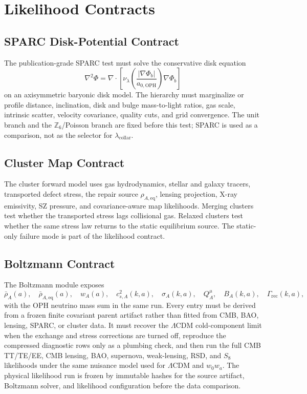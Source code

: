 \documentclass[11pt]{article}
\newcommand{\LCDM}{\Lambda\mathrm{CDM}}
\newcommand{\aoph}{a_{0,\mathrm{OPH}}}
\newcommand{\lambdac}{\lambda_{\mathrm{collar}}}
\newcommand{\Zsix}{\mathbb Z_6}
\begin{document}
\section{Likelihood Contracts}

\subsection{SPARC Disk-Potential Contract}

The publication-grade SPARC test must solve the conservative disk equation
\begin{equation}
  \nabla^2\Phi
  =
  \nabla\cdot
  \left[
    \nu_\lambda\!\left(\frac{|\nabla\Phi_b|}{\aoph}\right)
    \nabla\Phi_b
  \right]
\end{equation}
on an axisymmetric baryonic disk model.  The hierarchy must marginalize or
profile distance, inclination, disk and bulge mass-to-light ratios, gas scale,
intrinsic scatter, velocity covariance, quality cuts, and grid convergence.
The unit branch and the \(\Zsix\)/Poisson branch are fixed before this test;
SPARC is used as a comparison, not as the selector for \(\lambdac\).

\subsection{Cluster Map Contract}

The cluster forward model uses gas hydrodynamics, stellar and galaxy tracers,
transported defect stress, the repair source
\(\rho_{A,\mathrm{eq}}\), lensing projection, X-ray emissivity, SZ pressure,
and covariance-aware map likelihoods.  Merging clusters test whether the
transported stress lags collisional gas.  Relaxed clusters test whether the
same stress law returns to the static equilibrium source.  The static-only
failure mode is part of the likelihood contract.

\subsection{Boltzmann Contract}

The Boltzmann module exposes
\[
  \bar\rho_A(a),\quad
  \bar\rho_{A,\mathrm{eq}}(a),\quad
  w_A(a),\quad
  c_{s,A}^2(k,a),\quad
  \sigma_A(k,a),\quad
  Q_A^\mu,\quad
  B_A(k,a),\quad
  \Gamma_{\mathrm{rec}}(k,a),
\]
with the OPH neutrino mass sum in the same run.  Every entry must be derived
from a frozen finite covariant parent artifact rather than fitted from CMB,
BAO, lensing, SPARC, or cluster data.  It must recover the \(\LCDM\)
cold-component limit when the exchange and stress corrections are turned off,
reproduce the compressed diagnostic rows only as a plumbing check, and then run
the full CMB TT/TE/EE, CMB lensing, BAO, supernova, weak-lensing, RSD, and
\(S_8\) likelihoods under the same nuisance model used for \(\LCDM\) and
\(w_0w_a\).  The physical likelihood run is frozen by immutable hashes for the
source artifact, Boltzmann solver, and likelihood configuration before the data
comparison.
\end{document}
